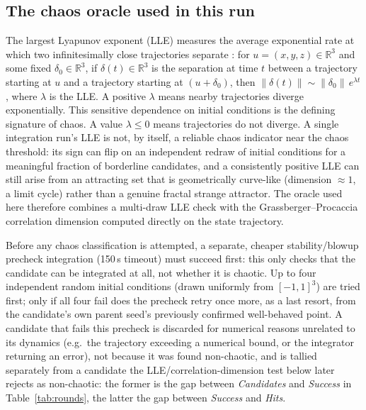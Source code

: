 \documentclass[11pt]{article}
\begin{document}
\subsection{The chaos oracle used in this run}
\label{sec:chaos-oracle}

The largest Lyapunov exponent (LLE) measures the average exponential rate at
which two infinitesimally close trajectories separate
\citep{benettin1980lyapunov}: for $u = (x, y, z) \in \mathbb{R}^3$ and some
fixed $\delta_0 \in \mathbb{R}^3$, if $\delta(t) \in \mathbb{R}^3$ is the
separation at time $t$ between a trajectory starting at $u$ and a
trajectory starting at $(u+\delta_0)$, then $\lVert \delta(t) \rVert \sim
\lVert \delta_0 \rVert\, e^{\lambda t}$, where $\lambda$ is the LLE. A positive $\lambda$ means nearby
trajectories diverge exponentially. This sensitive dependence on initial
conditions is the defining signature of chaos. A value $\lambda \leq 0$
means trajectories do not diverge. A single integration run's LLE is not, by itself,
a reliable chaos indicator near the chaos threshold: its sign can flip on an
independent redraw of initial conditions for a meaningful fraction of
borderline candidates, and a consistently positive LLE can still arise from
an attracting set that is geometrically curve-like (dimension $\approx 1$, a
limit cycle) rather than a genuine fractal strange attractor. The oracle used
here therefore combines a multi-draw LLE check with the Grassberger--Procaccia
correlation dimension \citep{grassberger1983measuring} computed directly on
the state trajectory.

Before any chaos classification is attempted, a separate, cheaper
stability/blowup precheck integration (150\,s timeout) must succeed first:
this only checks that the candidate can be integrated at all, not whether
it is chaotic. Up to four independent random initial conditions (drawn
uniformly from $[-1,1]^3$) are tried first; only if all four fail does the
precheck retry once more, as a last resort, from the candidate's own
parent seed's previously confirmed well-behaved point. A candidate that
fails this precheck is discarded for numerical reasons unrelated to
its dynamics (e.g.\ the trajectory exceeding a numerical bound, or the
integrator returning an error), not because it was found non-chaotic, and
is tallied separately from a candidate the LLE/correlation-dimension test
below later rejects as non-chaotic: the former is the gap between
\emph{Candidates} and \emph{Success} in Table~\ref{tab:rounds}, the latter
the gap between \emph{Success} and \emph{Hits}.
\end{document}
